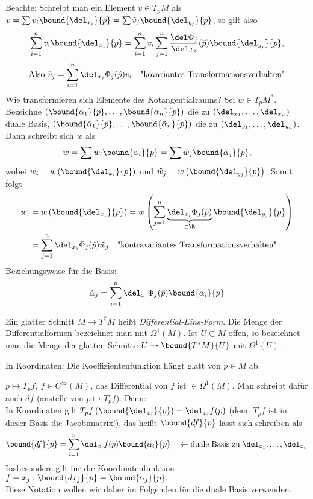 \begin{rem}\label{3.22}
	Beachte: Schreibt man ein Element $v \in T_pM$ als $ v = \sum v_i \bound{\del_{x_i}}{p} = \sum \tilde{v}_j \bound{\del_{y_j}}{p} $, so gilt also
	\[ \sum_{i=1}^{n} v_i \bound{\del_{x_i}}{p} = \sum_{i=1}^{n} v_i \sum_{j=1}^n \frac{\del\Phi_j}{\del x_i}(\hat{p}) \bound{\del_{y_j}}{p}, \]
	\[ \text{Also } \tilde{v}_j = \sum_{i=1}^n \del_{x_i} \Phi_j(\hat{p}) v_i\quad \text{"kovariantes Transformationsverhalten"} \]
	Wie transformieren sich Elemente des Kotangentialraums? Sei $w \in T_pM^*$. Bezeichne $ (\bound{\alpha_1}{p},\dotsc, \bound{\alpha_n}{p}) $ die zu $ (\del_{x_1},\dotsc, \del_{x_n}) $ duale Basis, $ (\bound{\tilde{\alpha}_1}{p},\dotsc, \bound{\tilde{\alpha}_n}{p}) $ die zu $ (\del_{y_1},\dotsc, \del_{y_n}) $. Dann schreibt sich $w$ als 
	\[ w = \sum w_i \bound{\alpha_i}{p} = \sum \tilde{w}_j \bound{\tilde{\alpha}_j}{p}, \]
	wobei $w_i = w \left( \bound{\del_{x_i}}{p} \right)$ und $\tilde{w}_j = w \left( \bound{\del_{y_j}}{p} \right)$. Somit folgt
	\begin{align*}
		w_i &= w \left( \bound{\del_{x_i}}{p} \right) = w \left( \sum_{j=1}^n \underbrace{\del_{x_i} \Phi_j(\hat{p})}_{\in \R} \bound{\del_{y_j}}{p} \right)\\
		&= \sum_{j=1}^n \del_{x_i} \Phi_j(\hat{p}) \tilde{w}_j\quad \text{"kontravariantes Transformationsverhalten"}
	\end{align*}
	Beziehungsweise für die Basis:
	\[ \tilde{\alpha}_j = \sum_{i=1}^n \del_{x_i}\Phi_j (\hat{p}) \bound{\alpha_i}{p} \]
\end{rem}
\addtocounter{thm}{1}
\begin{defn}
	Ein glatter Schnitt $M \to T^*M$ heißt \emph{Differential-Eins-Form}. Die Menge der Differentialformen bezeichnet man mit $\Omega^1(M)$. Ist $U \subset M$ offen, so bezeichnet man die Menge der glatten Schnitte $ U \to \bound{T^*M}{U} $ mit $\Omega^1(U)$.
\end{defn}

In Koordinaten: Die Koeffizientenfunktion hängt glatt von $p \in M$ ab:

\begin{exmp*}
	$p \mapsto T_pf,\ f \in C^\infty(M)$, das Differential von $f$ ist $\in \Omega^1(M)$. Man schreibt dafür auch $df$ (anstelle von $p \mapsto T_pf$). Denn:\\
	In Koordinaten gilt $ T_pf \left( \bound{\del_{x_i}}{p} \right) = \del_{x_i} f(p) $ (denn $T_pf$ ist in dieser Basis die Jacobimatrix!), das heißt $\bound{df}{p}$ lässt sich schreiben als
	\[ \bound{df}{p} = \sum_{i=1}^n \del_{x_i} f(p) \bound{\alpha_i}{p} \quad \leftarrow \text{duale Basis zu }\del_{x_1},\dotsc, \del_{x_n} \]
	Insbesondere gilt für die Koordinatenfunktion $ f = x_j: \bound{dx_j}{p} = \bound{\alpha_j}{p}. $\\
	Diese Notation wollen wir daher im Folgenden für die duale Basis verwenden.
\end{exmp*}

